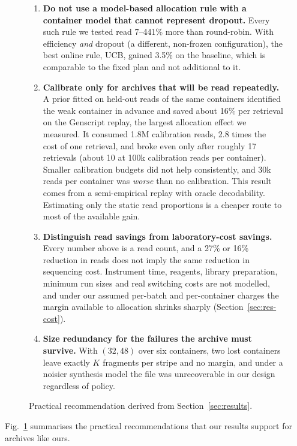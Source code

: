 \documentclass[conference,onecolumn,11pt]{IEEEtran}
\begin{document}
\begin{figure}[t]
{{\begin{enumerate}
\item \textbf{Do not use a model-based allocation rule with a container model that cannot represent
dropout.}  Every such rule we tested read 7--441\% more than round-robin.  With efficiency \emph{and}
dropout (a different, non-frozen configuration), the best online rule, UCB, gained 3.5\% on the baseline,
which is comparable to the fixed plan and not additional to it.
\item \textbf{Calibrate only for archives that will be read repeatedly.}  A prior fitted on held-out
reads of the same containers identified the weak container in advance and saved about 16\% per
retrieval on the Genscript replay, the largest allocation effect we measured.  It consumed 1.8M
calibration reads, 2.8 times the cost of one retrieval, and broke even only after roughly 17 retrievals
(about 10 at 100k calibration reads per container).  Smaller calibration budgets did not help
consistently, and 30k reads per container was \emph{worse} than no calibration.  This result comes from
a semi-empirical replay with oracle decodability.  Estimating only the static read proportions is a
cheaper route to most of the available gain.
\item \textbf{Distinguish read savings from laboratory-cost savings.}  Every number above is a read
count, and a 27\% or 16\% reduction in reads does not imply the same reduction in sequencing cost.
Instrument time, reagents, library preparation, minimum run sizes and real switching costs are not
modelled, and under our assumed per-batch and per-container charges the margin available to allocation
shrinks sharply (Section~\ref{sec:res-cost}).
\item \textbf{Size redundancy for the failures the archive must survive.}  With $(32,48)$ over six
containers, two lost containers leave exactly $K$ fragments per stripe and no margin, and under a
noisier synthesis model the file was unrecoverable in our design regardless of policy.
\end{enumerate}}}
\caption{Practical recommendation derived from Section~\ref{sec:results}.}
\label{fig:recommend}
\end{figure}
Fig.~\ref{fig:recommend} summarises the practical recommendations that our results support for
archives like ours.
\end{document}

